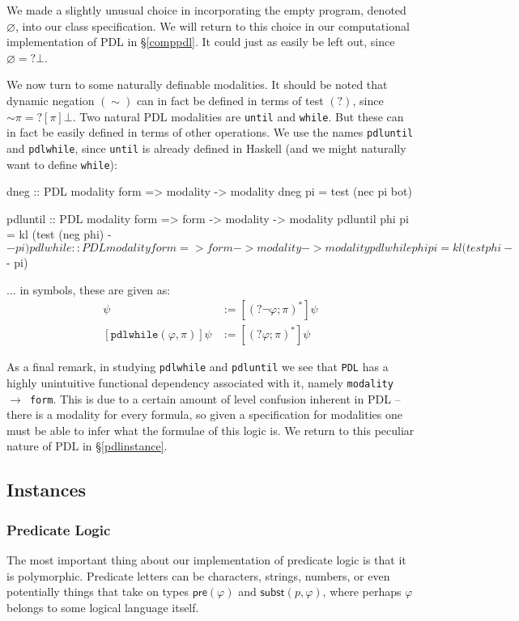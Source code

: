 \documentclass[11pt]{article}
\theoremstyle{definition}
\newcommand{\IMPL}{\rightarrow}
\begin{document}
We made a slightly unusual choice in incorporating the empty program, denoted $\varnothing$, into our class specification.  We will return to this choice in our computational implementation of PDL in \S\ref{comppdl}. It could just as easily be left out, since $\varnothing = ?\bot$.

We now turn to some naturally definable modalities.  It should be noted that dynamic negation $(\sim)$ can in fact be defined in terms of test $(?)$, since $\sim \pi = ?[\pi]\bot$.  Two natural PDL modalities are \texttt{until} and \texttt{while}.  But these can in fact be easily defined in terms of other operations.  We use the names \texttt{pdluntil} and \texttt{pdlwhile}, since \texttt{until} is already defined in Haskell (and we might naturally want to define \texttt{while}):

\begin{code}
dneg :: PDL modality form => modality -> modality
dneg pi = test (nec pi bot)

pdluntil :: PDL modality form => form -> modality -> modality
pdluntil phi pi = kl (test (neg phi) -$- pi)

pdlwhile :: PDL modality form => form -> modality -> modality
pdlwhile phi pi = kl (test phi -$- pi)
\end{code}

$\ldots$ in symbols, these are given as: 
\begin{align*}
[\texttt{pdluntil} (\varphi, \pi)] \psi &:= [(?\neg\varphi ; \pi)^\ast] \psi\\
[\texttt{pdlwhile} (\varphi, \pi)] \psi &:= [(?\varphi ; \pi)^\ast] \psi
\end{align*}

As a final remark, in studying \texttt{pdlwhile} and \texttt{pdluntil} we see that \texttt{PDL} has a highly unintuitive functional dependency associated with it, namely \texttt{modality $\IMPL$ form}.  This is due to a certain amount of level confusion inherent in PDL -- there is a modality for every formula, so given a specification for modalities one must be able to infer what the formulae of this logic is. We return to this peculiar nature of PDL in \S\ref{pdlinstance}.

\subsection{Instances}
\subsubsection{Predicate Logic}
The most important thing about our implementation of predicate logic is that it is polymorphic.  Predicate letters can be characters, strings, numbers, or even potentially things that take on types $\textsf{pre}(\varphi)$ and $\textsf{subst}(p, \varphi)$, where perhaps $\varphi$ belongs to some logical language itself.
\end{document}
